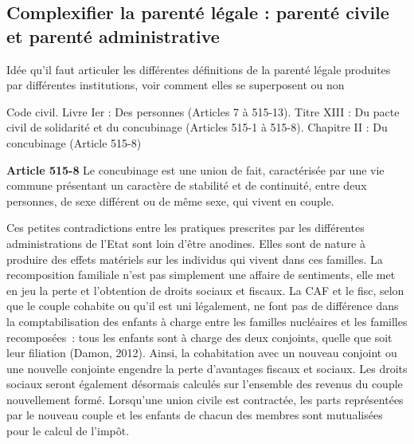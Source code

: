 \documentclass[
  12pt,
]{book}
\begin{document}
\subsection{Complexifier la parenté légale : parenté civile et parenté
administrative}\label{complexifier-la-parentuxe9-luxe9gale-parentuxe9-civile-et-parentuxe9-administrative}

Idée qu'il faut articuler les différentes définitions de la parenté
légale produites par différentes institutions, voir comment elles se
superposent ou non

\begin{encadre}{Code civil. Livre Ier : Des personnes (Articles 7 à 515-13). Titre XIII : Du pacte civil de solidarité et du concubinage (Articles 515-1 à 515-8). Chapitre II : Du concubinage (Article 515-8)}

\textbf{Article 515-8}
Le concubinage est une union de fait, caractérisée par une vie commune présentant un caractère de stabilité et de continuité, entre deux personnes, de sexe différent ou de même sexe, qui vivent en couple.

\end{encadre}

Ces petites contradictions entre les pratiques prescrites par les
différentes administrations de l'Etat sont loin d'être anodines. Elles
sont de nature à produire des effets matériels sur les individus qui
vivent dans ces familles. La recomposition familiale n'est pas
simplement une affaire de sentiments, elle met en jeu la perte et
l'obtention de droits sociaux et fiscaux. La CAF et le fisc, selon que
le couple cohabite ou qu'il est uni légalement, ne font pas de
différence dans la comptabilisation des enfants à charge entre les
familles nucléaires et les familles recomposées~: tous les enfants sont
à charge des deux conjoints, quelle que soit leur filiation (Damon,
2012). Ainsi, la cohabitation avec un nouveau conjoint ou une nouvelle
conjointe engendre la perte d'avantages fiscaux et sociaux. Les droits
sociaux seront également désormais calculés sur l'ensemble des revenus
du couple nouvellement formé. Lorsqu'une union civile est contractée,
les parts représentées par le nouveau couple et les enfants de chacun
des membres sont mutualisées pour le calcul de l'impôt.
\end{document}
